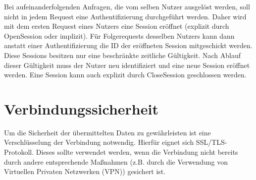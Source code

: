 Bei aufeinanderfolgenden Anfragen, die vom selben Nutzer ausgelöst werden, soll nicht in jedem Request eine Authentifizierung durchgeführt werden. Daher wird mit dem ersten Request eines Nutzers eine Session eröffnet (explizit durch OpenSession oder implizit). Für Folgerequests desselben Nutzers kann dann anstatt einer Authentifizierung die ID der eröffneten Session mitgeschickt werden. Diese Sessions besitzen nur eine beschränkte zeitliche Gültigkeit. Nach Ablauf dieser Gültigkeit muss der Nutzer neu identifiziert und eine neue Session eröffnet werden. Eine Session kann auch explizit durch CloseSession
geschlossen werden.

\section{Verbindungssicherheit}
Um die Sicherheit der übermittelten Daten zu gewährleisten ist eine Verschlüsselung der Verbindung notwendig. Hierfür eignet sich SSL/TLS-Protokoll. Dieses sollte verwendet werden, wenn die Verbindung nicht bereits durch andere entsprechende Maßnahmen (z.B. durch die Verwendung von Virtuellen Privaten Netzwerken (VPN)) gesichert ist.